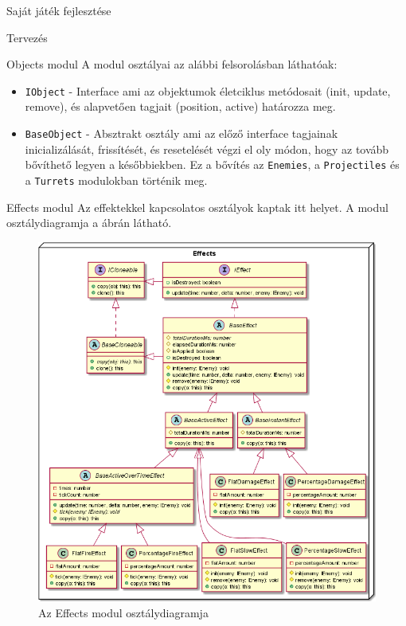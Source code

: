 \begin{MyChapter}{Saját játék fejlesztése}
\begin{MySection}{Tervezés}
\begin{MySubSection}{Objects modul}
			A modul osztályai az alábbi felsorolásban láthatóak:
			\begin{itemize}
				\item \texttt{IObject} - Interface ami az objektumok életciklus metódosait (init, update, remove), és alapvetően tagjait (position, active) határozza meg.
				
				\item \texttt{BaseObject} - Absztrakt osztály ami az előző interface tagjainak inicializálását, frissítését, és resetelését végzi el oly módon, hogy az tovább bővíthető legyen a későbbiekben. Ez a bővítés az \texttt{Enemies}, a \texttt{Projectiles} és a \texttt{Turrets} modulokban történik meg.
				
			\end{itemize}
		\end{MySubSection}
	
		\begin{MySubSection}{Effects modul}
			Az effektekkel kapcsolatos osztályok kaptak itt helyet.
			A modul osztálydiagramja a  ábrán látható.
			
			\begin{figure}[h!]
				\centering
				\includegraphics[width=1\textwidth]{kepek/uml/effects/effect.png}
				\caption{Az Effects modul osztálydiagramja}
				\label{fig:uml:effect}
			\end{figure}
			

\end{MySubSection}
\end{MySection}
\end{MyChapter}
